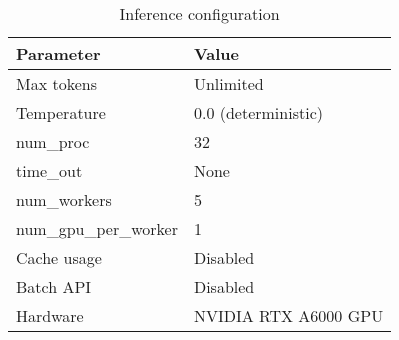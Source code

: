 \begin{table}[ht]
\small
  \centering
    \begin{tabular}{ll}
      \toprule
      \textbf{Parameter} & \textbf{Value} \\ \midrule
      Max tokens & Unlimited \\
      Temperature & 0.0 (deterministic) \\
      num\_proc & 32 \\
      time\_out & None \\
      num\_workers & 5 \\
      num\_gpu\_per\_worker & 1 \\
      Cache usage & Disabled \\
      Batch API & Disabled \\
      Hardware & NVIDIA RTX A6000 GPU \\ \bottomrule
    \end{tabular}
  \caption{Inference configuration}
  \label{tab:inference_configuration}
\vspace{-1em}
\end{table}